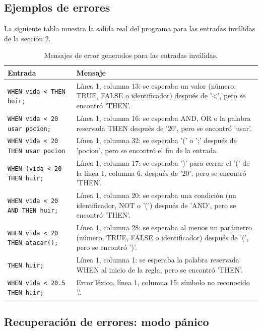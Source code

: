 \subsection{Ejemplos de errores}

La siguiente tabla muestra la salida real del programa para las entradas inválidas de la sección 2.

\begin{table}[H]
\centering
\caption{Mensajes de error generados para las entradas inválidas.}
\footnotesize
\renewcommand{\arraystretch}{1.3}
\begin{tabularx}{\textwidth}{|p{4.2cm}|X|}
\hline
\textbf{Entrada} & \textbf{Mensaje} \\ \hline
\texttt{WHEN vida < THEN huir;} & Línea 1, columna 13: se esperaba un valor (número, TRUE, FALSE o identificador) después de '<', pero se encontró 'THEN'. \\ \hline
\texttt{WHEN vida < 20 usar pocion;} & Línea 1, columna 16: se esperaba AND, OR o la palabra reservada THEN después de '20', pero se encontró 'usar'. \\ \hline
\texttt{WHEN vida < 20 THEN usar pocion} & Línea 1, columna 32: se esperaba '(' o ';' después de 'pocion', pero se encontró el fin de la entrada. \\ \hline
\texttt{WHEN (vida < 20 THEN huir;} & Línea 1, columna 17: se esperaba ')' para cerrar el '(' de la línea 1, columna 6, después de '20', pero se encontró 'THEN'. \\ \hline
\texttt{WHEN vida < 20 AND THEN huir;} & Línea 1, columna 20: se esperaba una condición (un identificador, NOT o '(') después de 'AND', pero se encontró 'THEN'. \\ \hline
\texttt{WHEN vida < 20 THEN atacar();} & Línea 1, columna 28: se esperaba al menos un parámetro (número, TRUE, FALSE o identificador) después de '(', pero se encontró ')'. \\ \hline
\texttt{THEN huir;} & Línea 1, columna 1: se esperaba la palabra reservada WHEN al inicio de la regla, pero se encontró 'THEN'. \\ \hline
\texttt{WHEN vida < 20.5 THEN huir;} & Error léxico, línea 1, columna 15: símbolo no reconocido '.'. \\ \hline
\end{tabularx}
\end{table}

\subsection{Recuperación de errores: modo pánico}

